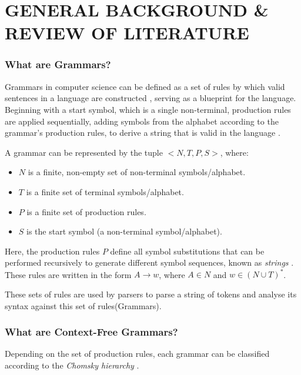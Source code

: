 \chapter{GENERAL BACKGROUND \& REVIEW OF LITERATURE}

\subsection{What are Grammars?}

Grammars in computer science can be defined as a set of rules by which valid sentences in a language are constructed \cite{jiangFormalGrammarsLanguages}, serving as a blueprint for the language. Beginning with a start symbol, which is a single non-terminal, production rules are applied sequentially, adding symbols from the alphabet according to the grammar’s production rules, to derive a string that is valid in the language \cite{GrammarTheoryComputation2025}.

\vspace{\baselineskip}

A grammar can be represented by the tuple $<N, T, P, S>$, where:
\begin{itemize}
\item $N$ is a finite, non-empty set of non-terminal symbols/alphabet.
\item $T$ is a finite set of terminal symbols/alphabet.
\item $P$ is a finite set of production rules.
\item $S$ is the start symbol (a non-terminal symbol/alphabet).
\end{itemize}

Here, the production rules $P$ define all symbol substitutions that can be performed recursively to generate different symbol sequences, known as \emph{strings} \cite{GrammarTheoryComputation2025}. These rules are written in the form $A \rightarrow w$, where $A \in N$ and $w \in (N \cup T)^*$.

\vspace{\baselineskip}
These sets of rules are used by parsers to parse a string of tokens and analyse its syntax against this set of rules(Grammars)\cite{mulikComparisonParsingTechniques,hendriksConsiderItParsed}.

\subsection{What are Context-Free Grammars?}

Depending on the set of production rules, each grammar can be classified according to the \emph{Chomsky hierarchy} \cite{chomskyTHREEMODELSTIE1956}.

